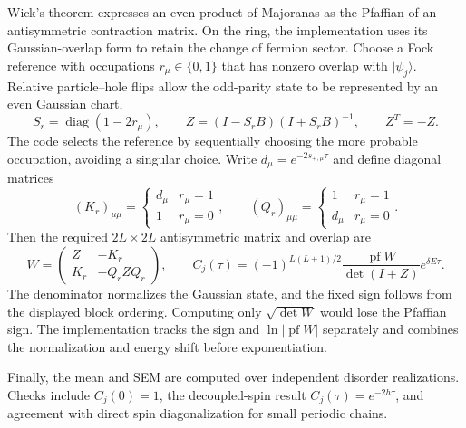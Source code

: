 \documentclass[a4paper,11pt]{article}
\begin{document}
Wick's theorem expresses an even product of Majoranas as the Pfaffian
of an antisymmetric contraction matrix. On the ring, the implementation
uses its Gaussian-overlap form to retain the change of fermion sector.
Choose a Fock reference with occupations $r_\mu\in\{0,1\}$ that has
nonzero overlap with $|\psi_j\rangle$. Relative particle--hole flips
allow the odd-parity state to be represented by an even Gaussian chart,
\begin{equation}
 S_r=\operatorname{diag}(1-2r_\mu),\qquad
 Z=(I-S_rB)(I+S_rB)^{-1},\qquad Z^T=-Z.
\end{equation}
The code selects the reference by sequentially choosing the more probable
occupation, avoiding a singular choice. Write $d_\mu=e^{-2s_{+,\mu}\tau}$
and define diagonal matrices
\begin{equation}
 (K_r)_{\mu\mu}=\begin{cases}d_\mu&r_\mu=1\\1&r_\mu=0\end{cases},
 \qquad
 (Q_r)_{\mu\mu}=\begin{cases}1&r_\mu=1\\d_\mu&r_\mu=0\end{cases}.
\end{equation}
Then the required $2L\times2L$ antisymmetric matrix and overlap are
\begin{equation}
 W=\begin{pmatrix}Z&-K_r\\K_r&-Q_rZQ_r\end{pmatrix},\qquad
 C_j(\tau)=(-1)^{L(L+1)/2}
 \frac{\operatorname{pf}W}{\det(I+Z)}e^{\delta E\tau}.
\end{equation}
The denominator normalizes the Gaussian state, and the fixed sign follows
from the displayed block ordering. Computing only $\sqrt{\det W}$ would
lose the Pfaffian sign. The implementation tracks the sign and
$\ln|\operatorname{pf}W|$ separately and combines the normalization and
energy shift before exponentiation.

Finally, the mean and SEM are computed over independent disorder
realizations. Checks include $C_j(0)=1$, the decoupled-spin result
$C_j(\tau)=e^{-2h\tau}$, and agreement with direct spin diagonalization
for small periodic chains.
\end{document}
